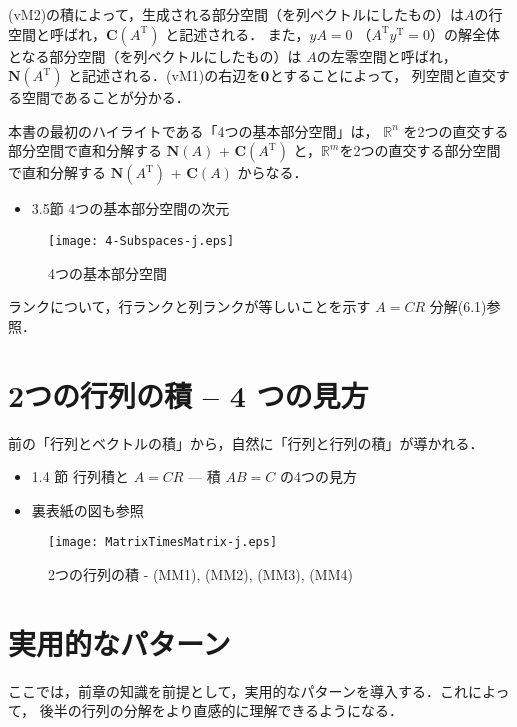 \documentclass[letterpaper]{article}
\newcommand{\bi}[1]{\hbox{\boldmath$#1$}}
\DeclareRobustCommand\transp{^{\mathrm{T}}}
\begin{document}
(vM2)の積によって，生成される部分空間（を列ベクトルにしたもの）は$A$の行空間と呼ばれ，$\mathbf{C}(A\transp)$ と記述される．
また，$yA=0$ （$A\transp y\transp=0$）の解全体となる部分空間（を列ベクトルにしたもの）は
$A$の左零空間と呼ばれ，$\mathbf{N}(A\transp)$ と記述される．(vM1)の右辺を$\bi{0}$とすることによって，
列空間と直交する空間であることが分かる．

本書の最初のハイライトである「4つの基本部分空間」は， $\mathbb{R}^n$ を2つの直交する部分空間で直和分解する
$\mathbf{N}(A)$ + $\mathbf{C}(A\transp)$ と，$\mathbb{R}^m$を2つの直交する部分空間で直和分解する
$\mathbf{N}(A\transp)$ + $\mathbf{C}(A)$ からなる．

\begin{itemize}
  \item 3.5節 4つの基本部分空間の次元
\end{itemize} 

\begin{figure}[H]
  \centering
  \texttt{[image: 4-Subspaces-j.eps]}
  \caption{4つの基本部分空間}
\end{figure}

ランクについて，行ランクと列ランクが等しいことを示す $A=CR$ 分解(6.1)参照．
\clearpage

\section{2つの行列の積 -- 4 つの見方}

前の「行列とベクトルの積」から，自然に「行列と行列の積」が導かれる．

\begin{itemize}
  \item 1.4 節 行列積と $A=CR$ \; --- 積 $AB=C$ の4つの見方
  \item 裏表紙の図も参照
\end{itemize} 


\begin{figure}[H]
  \texttt{[image: MatrixTimesMatrix-j.eps]}
  \caption{2つの行列の積 - (MM1), (MM2), (MM3), (MM4)}
\end{figure}

\section{実用的なパターン}

ここでは，前章の知識を前提として，実用的なパターンを導入する．これによって，
後半の行列の分解をより直感的に理解できるようになる．
\end{document}
